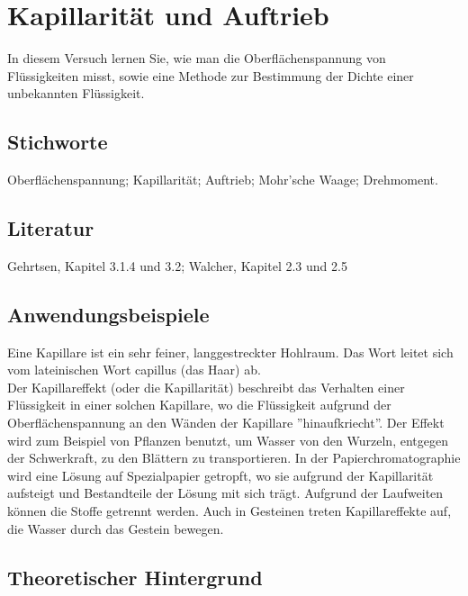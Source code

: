 \chapter{Kapillarität und Auftrieb}
\label{v:3}


In diesem Versuch lernen Sie, wie man die Oberflächenspannung von Flüssigkeiten misst, sowie eine Methode zur Bestimmung der Dichte einer unbekannten Flüssigkeit.

\section{Stichworte}
Oberflächenspannung; Kapillarität; Auftrieb; Mohr'sche Waage; Drehmoment.
%
\section{Literatur}
Gehrtsen, Kapitel 3.1.4 und 3.2; Walcher, Kapitel 2.3 und 2.5
%
\section{Anwendungsbeispiele}
%
Eine Kapillare ist ein sehr feiner, langgestreckter Hohlraum. Das Wort leitet sich vom lateinischen Wort capillus (das Haar) ab.\\
Der Kapillareffekt (oder die Kapillarität) beschreibt das Verhalten einer Flüssigkeit in einer solchen Kapillare, wo die Flüssigkeit aufgrund der Oberflächenspannung an den Wänden der Kapillare ''hinaufkriecht''. Der Effekt wird zum Beispiel von Pflanzen benutzt, um Wasser von den Wurzeln, entgegen der Schwerkraft, zu den Blättern zu transportieren. In der Papierchromatographie wird eine Lösung auf Spezialpapier getropft, wo sie aufgrund der Kapillarität aufsteigt und Bestandteile der Lösung mit sich trägt. Aufgrund der Laufweiten können die Stoffe getrennt werden. Auch in Gesteinen treten Kapillareffekte auf, die Wasser durch das Gestein bewegen.
%
\section{Theoretischer Hintergrund}

